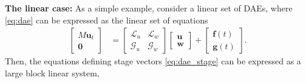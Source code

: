\documentclass[review]{siamart}
\begin{document}
\textbf{The linear case:} As a simple example, consider a
linear set of DAEs, where \eqref{eq:dae} can be expressed as the linear set of
equations
%
\begin{align}\label{eq:dae_lin}
\begin{bmatrix} M\mathbf{u}_t \\ \mathbf{0} \end{bmatrix}
& = \begin{bmatrix} \mathcal{L}_u & \mathcal{L}_w \\
	\mathcal{G}_u & \mathcal{G}_w\end{bmatrix}
	\begin{bmatrix} \mathbf{u} \\ \mathbf{w} \end{bmatrix} + 
		\begin{bmatrix}\mathbf{f}(t) \\ \mathbf{g}(t)\end{bmatrix}.
\end{align}
%
Then, the equations defining stage vectors \eqref{eq:dae_stage} can
be expressed as a large block linear system,
%
\end{document}
